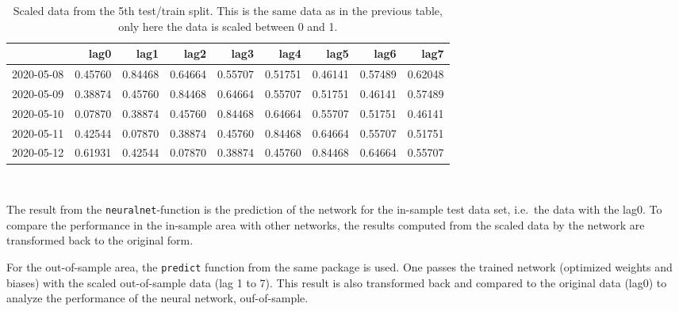 \documentclass[
]{article}
\begin{document}
\begin{table}[!h]

\caption{\label{tab:data_tab_scaled}Scaled data from the 5th test/train split. This is the same data as in the previous table, only here the data is scaled between 0 and 1.}
\centering
\begin{tabular}[t]{l>{}r>{}r>{}r>{}r>{}rrrr}
\toprule
  & lag0 & lag1 & lag2 & lag3 & lag4 & lag5 & lag6 & lag7\\
\midrule
2020-05-08 & \textcolor[HTML]{E413A3}{0.45760} & \textcolor[HTML]{000000}{0.84468} & \textcolor[HTML]{000000}{0.64664} & \textcolor[HTML]{000000}{0.55707} & \textcolor[HTML]{000000}{0.51751} & 0.46141 & 0.57489 & 0.62048\\
2020-05-09 & \textcolor[HTML]{000000}{0.38874} & \textcolor[HTML]{E413A3}{0.45760} & \textcolor[HTML]{000000}{0.84468} & \textcolor[HTML]{000000}{0.64664} & \textcolor[HTML]{000000}{0.55707} & 0.51751 & 0.46141 & 0.57489\\
2020-05-10 & \textcolor[HTML]{000000}{0.07870} & \textcolor[HTML]{000000}{0.38874} & \textcolor[HTML]{E413A3}{0.45760} & \textcolor[HTML]{000000}{0.84468} & \textcolor[HTML]{000000}{0.64664} & 0.55707 & 0.51751 & 0.46141\\
2020-05-11 & \textcolor[HTML]{000000}{0.42544} & \textcolor[HTML]{000000}{0.07870} & \textcolor[HTML]{000000}{0.38874} & \textcolor[HTML]{E413A3}{0.45760} & \textcolor[HTML]{000000}{0.84468} & 0.64664 & 0.55707 & 0.51751\\
2020-05-12 & \textcolor[HTML]{000000}{0.61931} & \textcolor[HTML]{000000}{0.42544} & \textcolor[HTML]{000000}{0.07870} & \textcolor[HTML]{000000}{0.38874} & \textcolor[HTML]{E413A3}{0.45760} & 0.84468 & 0.64664 & 0.55707\\
\bottomrule
\end{tabular}
\end{table}

~

The result from the \texttt{neuralnet}-function is the prediction of the
network for the in-sample test data set, i.e.~the data with the lag0. To
compare the performance in the in-sample area with other networks, the
results computed from the scaled data by the network are transformed
back to the original form.

For the out-of-sample area, the \texttt{predict} function from the same
package is used. One passes the trained network (optimized weights and
biases) with the scaled out-of-sample data (lag 1 to 7). This result is
also transformed back and compared to the original data (lag0) to
analyze the performance of the neural network, ouf-of-sample.
\end{document}
